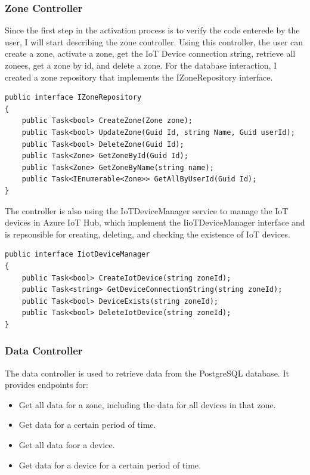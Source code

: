\subsubsection{Zone Controller}
Since the first step in the activation process is to verify the code enterede by the
user, I will start describing the zone controller.
Using this controller, the user can create a zone, activate a zone, get the IoT Device connection string, retrieve
all zonees, get a zone by id, and delete a zone. For the database interaction, I created
a zone repository that implements the IZoneRepository interface.
\begin{lstlisting}[caption={Zone Repository interface}]
public interface IZoneRepository
{
    public Task<bool> CreateZone(Zone zone);
    public Task<bool> UpdateZone(Guid Id, string Name, Guid userId);
    public Task<bool> DeleteZone(Guid Id);
    public Task<Zone> GetZoneById(Guid Id);
    public Task<Zone> GetZoneByName(string name);
    public Task<IEnumerable<Zone>> GetAllByUserId(Guid Id);
}
\end{lstlisting}

The controller is also using the IoTDeviceManager service to manage the
IoT devices in Azure IoT Hub, which implement the IioTDeviceManager interface and 
is repsonsible for creating, deleting, and checking the existence of IoT devices.

\begin{lstlisting}[caption={IoT Device manager interface}]
public interface IiotDeviceManager
{
    public Task<bool> CreateIotDevice(string zoneId);
    public Task<string> GetDeviceConnectionString(string zoneId);
    public Task<bool> DeviceExists(string zoneId);
    public Task<bool> DeleteIotDevice(string zoneId);
}
\end{lstlisting}

\subsubsection{Data Controller}
The data controller is used to retrieve data from the PostgreSQL database.
It provides endpoints for:
\begin{itemize}
    \item Get all data for a zone, including the data for all devices in that zone.
    \item Get data for a certain period of time.
    \item Get all data foor a device.
    \item Get data for a device for a certain period of time.
\end{itemize}

